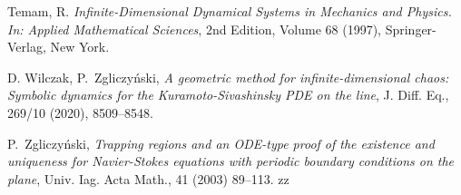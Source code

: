 \begin{thebibliography}{HNW00}

 Temam, R. \emph{Infinite-Dimensional Dynamical Systems in Mechanics and Physics. In: Applied Mathematical Sciences}, 2nd Edition, Volume 68 (1997), Springer-Verlag, New York.









 D. Wilczak, P.\ Zgliczy\'nski, \emph{A geometric method for in\-fi\-ni\-te-di\-men\-sional chaos: Symbolic dynamics for the Kuramoto-Sivashinsky PDE on the line},  J. Diff. Eq., 269/10 (2020), 8509--8548.



  P.\ Zgliczy\'nski, \emph{Trapping regions  and an ODE-type proof of the existence and
uniqueness for Navier-Stokes equations with periodic boundary conditions on the plane}, Univ. Iag. Acta Math., 41 (2003) 89--113.
zz





\end{thebibliography}
